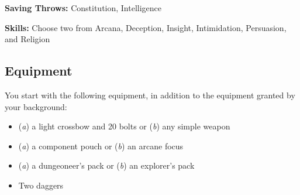\textbf{Saving Throws:} Constitution, Intelligence

\textbf{Skills:} Choose two from Arcana, Deception, Insight, Intimidation, Persuasion, and Religion

\subsection{Equipment}

You start with the following equipment, in addition to the equipment granted by your background:
\begin{itemize}
\item (\textit{a}) a light crossbow and 20 bolts or (\textit{b}) any simple weapon
\item (\textit{a}) a component pouch or (\textit{b}) an arcane focus
\item (\textit{a}) a dungeoneer's pack or (\textit{b}) an explorer's pack
\item Two daggers
\end{itemize}

